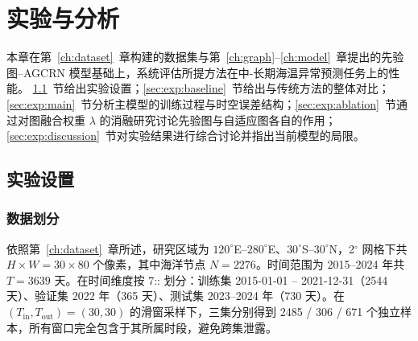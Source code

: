 
\chapter{实验与分析}
\label{ch:experiment}

本章在第~\ref{ch:dataset}~章构建的数据集与第~\ref{ch:graph}--\ref{ch:model}~章提出的先验图--AGCRN 模型基础上，系统评估所提方法在中-长期海温异常预测任务上的性能。
\ref{sec:exp:setup}~节给出实验设置；\ref{sec:exp:baseline}~节给出与传统方法的整体对比；\ref{sec:exp:main}~节分析主模型的训练过程与时空误差结构；\ref{sec:exp:ablation}~节通过对图融合权重 $\lambda$ 的消融研究讨论先验图与自适应图各自的作用；\ref{sec:exp:discussion}~节对实验结果进行综合讨论并指出当前模型的局限。

\section{实验设置}
\label{sec:exp:setup}

\subsection{数据划分}
依照第~\ref{ch:dataset}~章所述，研究区域为 $120^{\circ}$E--$280^{\circ}$E、$30^{\circ}$S--$30^{\circ}$N，2$^{\circ}$ 网格下共 $H\!\times\!W=30\!\times\!80$ 个像素，其中海洋节点 $N=2276$。时间范围为 2015--2024 年共 $T=3639$ 天。在时间维度按 7\!:\!: 划分：训练集 2015-01-01 -- 2021-12-31（2544 天）、验证集 2022 年（365 天）、测试集 2023--2024 年（730 天）。在 $(T_{\text{in}}, T_{\text{out}}) = (30, 30)$ 的滑窗采样下，三集分别得到 2485 / 306 / 671 个独立样本，所有窗口完全包含于其所属时段，避免跨集泄露。

